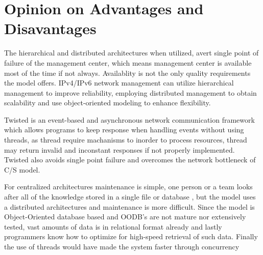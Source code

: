 \documentclass[a4paper,12pt]{report}
\begin{document}
\section{Opinion on Advantages and Disavantages}
\par{
The hierarchical and distributed architectures when utilized, avert single point of failure of the management center, which means management center is available most of the time if not always. Availablity is not the only quality requirements the model offers. IPv4/IPv6 network management can utilize hierarchical management to improve reliability, employing distributed management to obtain scalability and use object-oriented modeling to enhance flexibility.
}

\par{Twisted is an event-based and asynchronous network communication framework which allows programs to keep response when handling events without using threads, as thread require machanisms to inorder to process resources, thread may return invalid and inconstant responses if not properly implemented. Twisted also avoids single point failure and overcomes the network bottleneck of C/S model.
}

\par{For centralized architectures maintenance is simple, one person or a team looks after all of the knowledge stored in a single file or database , but the model uses a distributed architectures and maintenance is more difficult. Since the model is Object-Oriented database based and OODB's are not mature nor extensively tested, vast amounts of data is in relational format already and lastly programmers know how to optimize for high-speed retrieval of such data. Finally the use of threads would have made the system faster through concurrency
}
\end{document}
